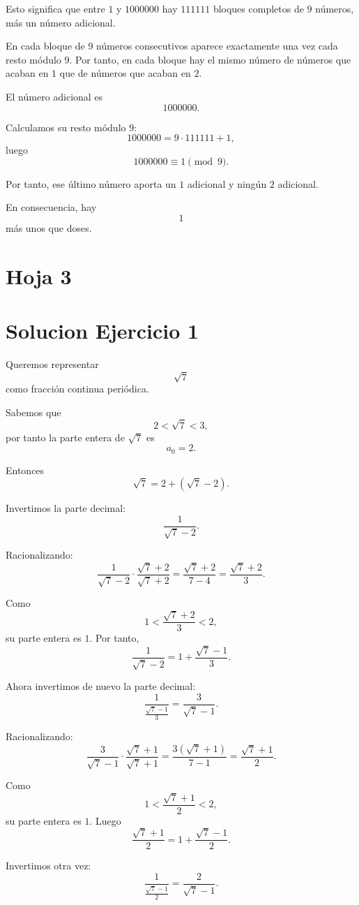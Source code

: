 \documentclass[12pt]{article}
\begin{document}
Esto significa que entre \(1\) y \(1000000\) hay \(111111\) bloques completos de \(9\) números, más un número adicional.

En cada bloque de \(9\) números consecutivos aparece exactamente una vez cada resto módulo \(9\). Por tanto, en cada bloque hay el mismo número de números que acaban en \(1\) que de números que acaban en \(2\).

El número adicional es
\[
1000000.
\]

Calculamos su resto módulo \(9\):
\[
1000000=9\cdot 111111+1,
\]
luego
\[
1000000\equiv 1\pmod 9.
\]

Por tanto, ese último número aporta un \(1\) adicional y ningún \(2\) adicional.

En consecuencia, hay
\[
\boxed{1}
\]
más unos que doses.

\section*{Hoja 3}

\section*{Solucion Ejercicio 1}

Queremos representar
\[
\sqrt{7}
\]
como fracción continua periódica.

Sabemos que
\[
2<\sqrt{7}<3,
\]
por tanto la parte entera de \(\sqrt{7}\) es
\[
a_0=2.
\]

Entonces
\[
\sqrt{7}=2+(\sqrt{7}-2).
\]

Invertimos la parte decimal:
\[
\frac{1}{\sqrt{7}-2}.
\]

Racionalizando:
\[
\frac{1}{\sqrt{7}-2}\cdot \frac{\sqrt{7}+2}{\sqrt{7}+2}
=
\frac{\sqrt{7}+2}{7-4}
=
\frac{\sqrt{7}+2}{3}.
\]

Como
\[
1<\frac{\sqrt{7}+2}{3}<2,
\]
su parte entera es \(1\). Por tanto,
\[
\frac{1}{\sqrt{7}-2}
=
1+\frac{\sqrt{7}-1}{3}.
\]

Ahora invertimos de nuevo la parte decimal:
\[
\frac{1}{\frac{\sqrt{7}-1}{3}}
=
\frac{3}{\sqrt{7}-1}.
\]

Racionalizando:
\[
\frac{3}{\sqrt{7}-1}\cdot \frac{\sqrt{7}+1}{\sqrt{7}+1}
=
\frac{3(\sqrt{7}+1)}{7-1}
=
\frac{\sqrt{7}+1}{2}.
\]

Como
\[
1<\frac{\sqrt{7}+1}{2}<2,
\]
su parte entera es \(1\). Luego
\[
\frac{\sqrt{7}+1}{2}
=
1+\frac{\sqrt{7}-1}{2}.
\]

Invertimos otra vez:
\[
\frac{1}{\frac{\sqrt{7}-1}{2}}
=
\frac{2}{\sqrt{7}-1}.
\]
\end{document}
